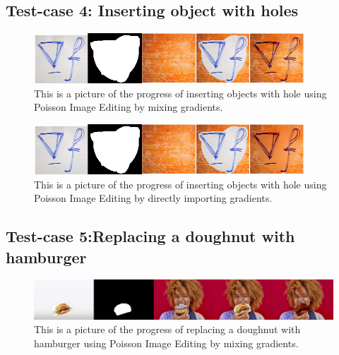 \documentclass[10pt, a4paper]{article}%
\begin{document}
 \subsection{Test-case 4: Inserting object with holes}
 \begin{figure}[H]
     \centering
     \includegraphics[width=0.9\textwidth]{merged_result_mix.png}
     \caption{This is a picture of the progress of inserting objects with hole using Poisson Image Editing by mixing gradients.}
     \label{fig:my_label}
 \end{figure}
  \begin{figure}[H]
     \centering
     \includegraphics[width=0.9\textwidth]{merged_result_import.png}
     \caption{This is a picture of the progress of inserting objects with hole using Poisson Image Editing by directly importing gradients.}
     \label{fig:my_label}
 \end{figure}
 \subsection{Test-case 5:Replacing a doughnut with hamburger}
 \begin{figure}[H]
     \centering
     \includegraphics[width=1.1\textwidth]{progress_import.jpg}
     \caption{This is a picture of the progress of replacing a doughnut with hamburger using Poisson Image Editing by mixing gradients.}
     \label{fig:my_label}
 \end{figure}
\end{document}

